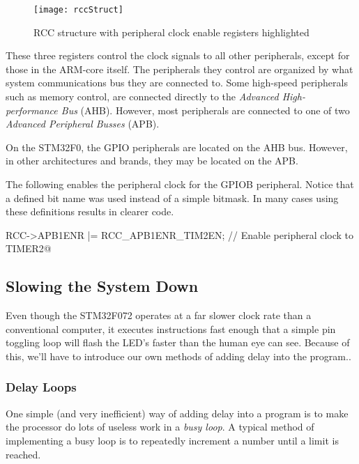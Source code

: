 \documentclass[11pt,fleqn]{book} %
\makeatletter
\newcommand{\ilcode}[1]{
    \begin{center} \parskip=-15pt \colorbox{gray!20!white}{
        \parbox{\columnwidth-2\fboxsep}{
            \lstinline@#1@
        }
    } \end{center}
}
\makeatother
\begin{document}
\begin{figure}[]
    \centering\texttt{[image: rccStruct]}
    \caption{RCC structure with peripheral clock enable registers highlighted}
    \label{rccStruct}
\end{figure}

These three registers control the clock signals to all other peripherals, except for those in the ARM-core itself. The peripherals they control are organized by what system communications bus they are connected to. Some high-speed peripherals such as memory control, are connected directly to the \textit{Advanced High-performance Bus} (AHB). However, most peripherals are connected to one of two \textit{Advanced Peripheral Busses} (APB).

On the STM32F0, the GPIO peripherals are located on the AHB bus. However, in other architectures and brands, they may be located on the APB.

\begin{example}
    The following enables the peripheral clock for the GPIOB peripheral. Notice that a defined bit name was used instead of a simple bitmask. In many cases using these definitions results in clearer code.

    \ilcode{RCC->APB1ENR |= RCC\_APB1ENR\_TIM2EN;    // Enable peripheral clock to TIMER2}
    \smallskip
\end{example}

\subsection{Slowing the System Down}
Even though the STM32F072 operates at a far slower clock rate than a conventional computer, it executes instructions fast enough that a simple pin toggling loop will flash the LED's faster than the human eye can see. Because of this, we'll have to introduce our own methods of adding delay into the program..

\subsubsection{Delay Loops}
One simple (and very inefficient) way of adding delay into a program is to make the processor do lots of useless work in a \textit{busy loop}. A typical method of implementing a busy loop is to repeatedly increment a number until a limit is reached.
\end{document}
